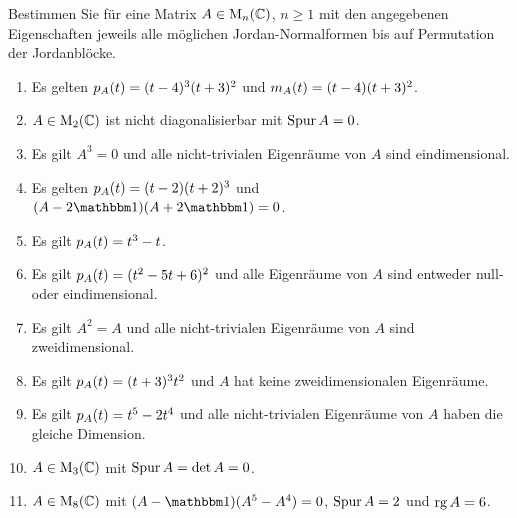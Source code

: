 \documentclass[a4paper, 10pt]{scrartcl}
\begin{document}
\begin{question}[subtitle = Implizites Bestimmen von Jordan-Normalformen]
  Bestimmen Sie für eine Matrix $A \in \operatorname{M}_{n}(\mathbb{C})$, $n \geq 1$ mit den angegebenen Eigenschaften jeweils alle möglichen Jordan-Normalformen bis auf Permutation der Jordanblöcke.
  \begin{enumerate}
    \item
      Es gelten $p_{A}(t) = (t-4)^3 (t+3)^2$ und $m_{A}(t) = (t-4) (t+3)^2$.
    \item
      $A\in \operatorname{M}_{2}(\mathbb{C})$ ist nicht diagonalisierbar mit $\operatorname{Spur} A = 0$.
    \item
      Es gilt $A^3 = 0$ und alle nicht-trivialen Eigenräume von $A$ sind eindimensional.
    \item
      Es gelten $p_{A}(t) = (t-2)(t+2)^3$ und $(A - 2 \Id)(A + 2 \Id) = 0$.
    \item
      Es gilt $p_{A}(t) = t^3 - t$.
    \item
      Es gilt $p_{A}(t) = (t^2 - 5t + 6)^2$ und alle Eigenräume von $A$ sind entweder null- oder eindimensional.
    \item
      Es gilt $A^2 = A$ und alle nicht-trivialen Eigenräume von $A$ sind zweidimensional.
    \item
      Es gilt $p_{A}(t) = (t + 3)^3 t^2$ und $A$ hat keine zweidimensionalen Eigenräume.
    \item
      Es gilt $p_{A}(t) = t^5 -2 t^4$ und alle nicht-trivialen Eigenräume von $A$ haben die gleiche Dimension.
    \item
      $A \in \operatorname{M}_{3}(\mathbb{C})$ mit $\operatorname{Spur} A = \det A = 0$.
    \item
      $A \in \operatorname{M}_{8}(\mathbb{C})$ mit $(A - \Id)(A^5 - A^4) = 0$, $\operatorname{Spur} A = 2$ und $\operatorname{rg} A = 6$.
  \end{enumerate}
\end{question}
\end{document}
